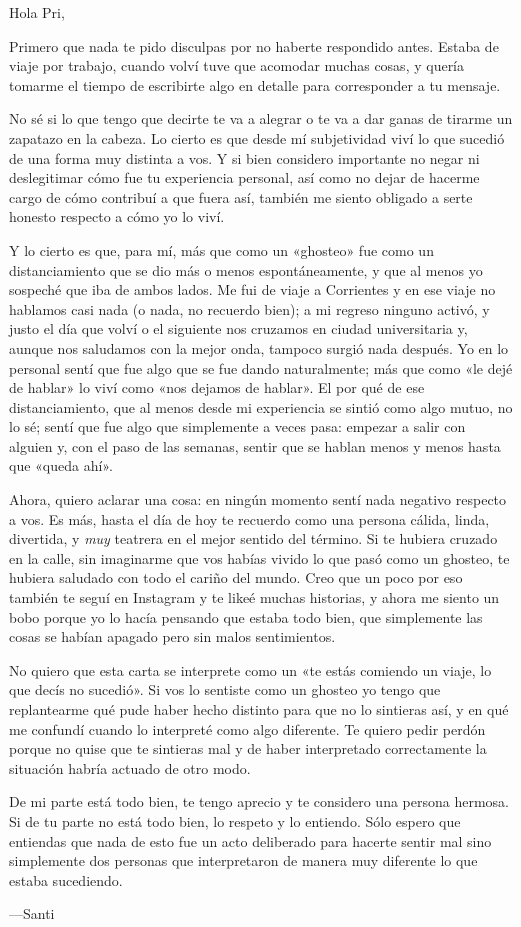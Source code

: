 \documentclass[a4paper]{article}
\begin{document}
    

Hola Pri,

Primero que nada te pido disculpas por no haberte respondido antes. Estaba de
viaje por trabajo, cuando volví tuve que acomodar muchas cosas, y quería tomarme
el tiempo de escribirte algo en detalle para corresponder a tu mensaje.

No sé si lo que tengo que decirte te va a alegrar o te va a dar ganas de tirarme
un zapatazo en la cabeza. Lo cierto es que desde mí subjetividad viví lo que
sucedió de una forma muy distinta a vos. Y si bien considero importante no negar
ni deslegitimar cómo fue tu experiencia personal, así como no dejar de hacerme
cargo de cómo contribuí a que fuera así, también me siento obligado a serte
honesto respecto a cómo yo lo viví.

Y lo cierto es que, para mí, más que como un «ghosteo» fue como un
distanciamiento que se dio más o menos espontáneamente, y que al menos yo
sospeché que iba de ambos lados. Me fui de viaje a Corrientes y en ese viaje no
hablamos casi nada (o nada, no recuerdo bien); a mi regreso ninguno activó, y
justo el día que volví o el siguiente nos cruzamos en ciudad universitaria y,
aunque nos saludamos con la mejor onda, tampoco surgió nada después. Yo en lo
personal sentí que fue algo que se fue dando naturalmente; más que como «le dejé
de hablar» lo viví como «nos dejamos de hablar». El por qué de ese
distanciamiento, que al menos desde mi experiencia se sintió como algo mutuo, no
lo sé; sentí que fue algo que simplemente a veces pasa: empezar a salir con
alguien y, con el paso de las semanas, sentir que se hablan menos y menos hasta
que «queda ahí».

Ahora, quiero aclarar una cosa: en ningún momento sentí nada negativo respecto a
vos. Es más, hasta el día de hoy te recuerdo como una persona cálida, linda,
divertida, y \textit{muy} teatrera en el mejor sentido del término. Si te
hubiera cruzado en la calle, sin imaginarme que vos habías vivido lo que pasó
como un ghosteo, te hubiera saludado con todo el cariño del mundo. Creo que un
poco por eso también te seguí en Instagram y te likeé muchas historias, y ahora
me siento un bobo porque yo lo hacía pensando que estaba todo bien, que
simplemente las cosas se habían apagado pero sin malos sentimientos.

No quiero que esta carta se interprete como un «te estás comiendo un viaje, lo
que decís no sucedió». Si vos lo sentiste como un ghosteo yo tengo que
replantearme qué pude haber hecho distinto para que no lo sintieras así, y en
qué me confundí cuando lo interpreté como algo diferente. Te quiero pedir perdón
porque no quise que te sintieras mal y de haber interpretado correctamente la
situación habría actuado de otro modo. 

De mi parte está todo bien, te tengo aprecio y te considero una persona hermosa.
Si de tu parte no está todo bien, lo respeto y lo entiendo. Sólo espero que
entiendas que nada de esto fue un acto deliberado para hacerte sentir mal sino
simplemente dos personas que interpretaron de manera muy diferente lo que estaba
sucediendo.

---Santi
\end{document}
